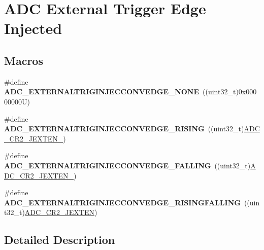 \hypertarget{group___a_d_c_ex___external__trigger__edge___injected}{}\section{A\+DC External Trigger Edge Injected}
\label{group___a_d_c_ex___external__trigger__edge___injected}
\subsection*{Macros}
\begin{DoxyCompactItemize}
\item 
\mbox{\label{group___a_d_c_ex___external__trigger__edge___injected_gaedb012452f83496891fcf1992130a0de}} 
\#define {\bfseries A\+D\+C\+\_\+\+E\+X\+T\+E\+R\+N\+A\+L\+T\+R\+I\+G\+I\+N\+J\+E\+C\+C\+O\+N\+V\+E\+D\+G\+E\+\_\+\+N\+O\+NE}~((uint32\+\_\+t)0x00000000\+U)
\item 
\mbox{\label{group___a_d_c_ex___external__trigger__edge___injected_gaf5561fa00f50245c3e497ed5bd70d25e}} 
\#define {\bfseries A\+D\+C\+\_\+\+E\+X\+T\+E\+R\+N\+A\+L\+T\+R\+I\+G\+I\+N\+J\+E\+C\+C\+O\+N\+V\+E\+D\+G\+E\+\_\+\+R\+I\+S\+I\+NG}~((uint32\+\_\+t)\mbox{\hyperlink{group___peripheral___registers___bits___definition_ga0b3c99510de210ff3137ff8de328889b}{A\+D\+C\+\_\+\+C\+R2\+\_\+\+J\+E\+X\+T\+E\+N\+\_}})
\item 
\mbox{\label{group___a_d_c_ex___external__trigger__edge___injected_ga517972cd277a53e20ff2e44b3e07afa6}} 
\#define {\bfseries A\+D\+C\+\_\+\+E\+X\+T\+E\+R\+N\+A\+L\+T\+R\+I\+G\+I\+N\+J\+E\+C\+C\+O\+N\+V\+E\+D\+G\+E\+\_\+\+F\+A\+L\+L\+I\+NG}~((uint32\+\_\+t)\mbox{\hyperlink{group___peripheral___registers___bits___definition_ga949c70fdf36a32a6afcbf44fec123832}{A\+D\+C\+\_\+\+C\+R2\+\_\+\+J\+E\+X\+T\+E\+N\+\_}})
\item 
\mbox{\label{group___a_d_c_ex___external__trigger__edge___injected_ga874e33f936d9cfc440a46919bf132b22}} 
\#define {\bfseries A\+D\+C\+\_\+\+E\+X\+T\+E\+R\+N\+A\+L\+T\+R\+I\+G\+I\+N\+J\+E\+C\+C\+O\+N\+V\+E\+D\+G\+E\+\_\+\+R\+I\+S\+I\+N\+G\+F\+A\+L\+L\+I\+NG}~((uint32\+\_\+t)\mbox{\hyperlink{group___peripheral___registers___bits___definition_ga07330f702208792faca3a563dc4fd9c6}{A\+D\+C\+\_\+\+C\+R2\+\_\+\+J\+E\+X\+T\+EN}})
\end{DoxyCompactItemize}


\subsection{Detailed Description}
